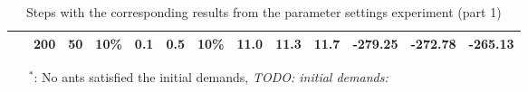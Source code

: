 \begin{sidewaystable}
\begin{tabular}{|l|l|l|l|l|l|l||c|c|c|c|c|c|}
    ~ & \textbf{200} & 50 & 10\% & 0.1 & 0.5 & 10\% & 11.0 & 11.3 & 11.7 & -279.25 & -272.78 & -265.13 \\
    \hline
    \end{tabular}
    \caption {Steps with the corresponding results from the parameter settings experiment (part 1)}
    \tiny
    \begin{itemize}[noitemsep]
    \item[$^*$:] No ants satisfied the initial demands, \emph{\color{blue} TODO: initial demands: }
    \end{itemize}
    \label{table:pm1}
\end{sidewaystable}



